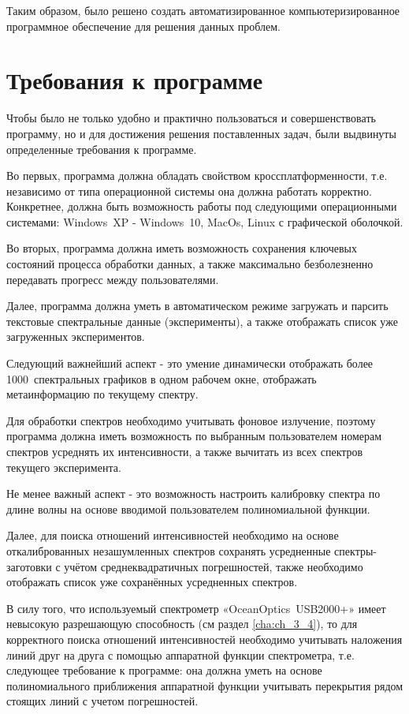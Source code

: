 Таким образом, было решено создать автоматизированное компьютеризированное программное обеспечение для решения данных проблем.

\section{Требования к программе}
Чтобы было не только удобно и практично пользоваться и совершенствовать программу, но и для достижения решения
поставленных задач, были выдвинуты определенные требования к программе.

Во первых, программа должна обладать свойством кроссплатформенности, т.е. независимо от типа операционной
системы она должна работать корректно. Конкретнее, должна быть возможность работы под следующими операционными
системами: Windows~XP - Windows~10, MacOs, Linux с графической оболочкой.

Во вторых, программа должна иметь возможность сохранения ключевых состояний процесса обработки данных,
а также максимально безболезненно передавать прогресс между пользователями.

Далее, программа должна уметь в автоматическом режиме загружать и парсить текстовые спектральные данные
(эксперименты), а также отображать список уже загруженных экспериментов.

Следующий важнейший аспект - это умение динамически отображать более 1000~спектральных графиков в одном
рабочем окне, отображать метаинформацию по текущему спектру.

Для обработки спектров необходимо учитывать фоновое излучение, поэтому программа должна иметь возможность по
выбранным пользователем номерам спектров усреднять их интенсивности, а также вычитать из всех спектров текущего эксперимента.

Не менее важный аспект - это возможность настроить калибровку спектра по длине волны на основе вводимой пользователем полиномиальной функции.

Далее, для поиска отношений интенсивностей необходимо на основе откалиброванных незашумленных спектров сохранять
усредненные спектры-заготовки с учётом среднеквадратичных погрешностей, также необходимо отображать
список уже сохранённых усредненных спектров.

В силу того, что используемый спектрометр «OceanOptics~USB2000+» имеет невысокую разрешающую
способность (см раздел \ref{cha:ch_3_4}), то для корректного поиска отношений интенсивностей
необходимо учитывать наложения линий друг на друга с помощью аппаратной функции спектрометра,
т.е. следующее требование к программе: она должна уметь на основе полиномиального приближения аппаратной
функции учитывать перекрытия рядом стоящих линий с учетом погрешностей.

